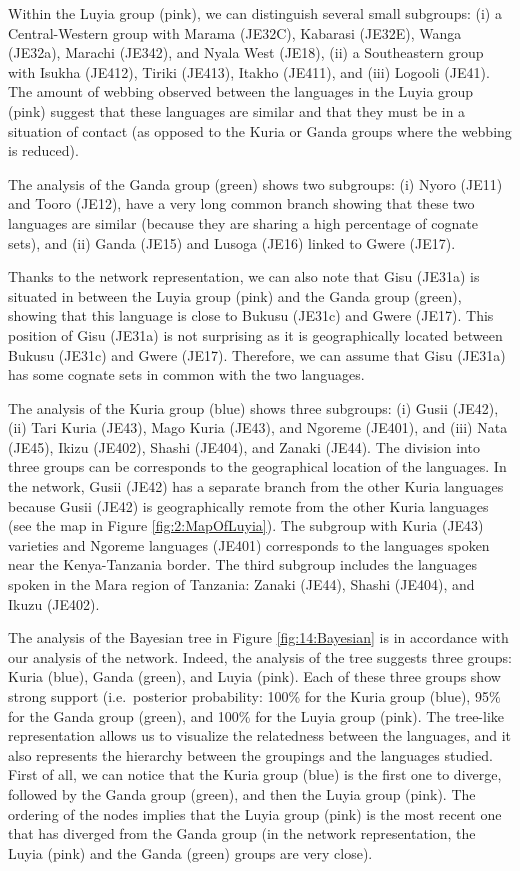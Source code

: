 \documentclass[output=paper]{langscibook}
\begin{document}
Within the Luyia group (pink), we can distinguish several small subgroups: (i) a Central-Western group with Marama (JE32C), Kabarasi (JE32E), Wanga (JE32a), Marachi (JE342), and Nyala West (JE18), (ii) a Southeastern group with Isukha (JE412), Tiriki (JE413), Itakho (JE411), and (iii) Logooli (JE41). The amount of webbing observed between the languages in the Luyia group (pink) suggest that these languages are similar and that they must be in a situation of contact (as opposed to the Kuria or Ganda groups where the webbing is reduced).

The analysis of the Ganda group (green) shows two subgroups: (i) Nyoro (JE11) and Tooro (JE12), have a very long common branch showing that these two languages are similar (because they are sharing a high percentage of cognate sets), and (ii) Ganda (JE15) and Lusoga (JE16) linked to Gwere (JE17).

Thanks to the network representation, we can also note that Gisu (JE31a) is situated in between the Luyia group (pink) and the Ganda group (green), showing that this language is close to Bukusu (JE31c) and Gwere (JE17). This position of Gisu (JE31a) is not surprising as it is geographically located between Bukusu (JE31c) and Gwere (JE17). Therefore, we can assume that Gisu (JE31a) has some cognate sets in common with the two languages. 

The analysis of the Kuria group (blue) shows three subgroups: (i) Gusii (JE42), (ii) Tari Kuria (JE43), Mago Kuria (JE43), and Ngoreme (JE401), and (iii) Nata (JE45), Ikizu (JE402), Shashi (JE404), and Zanaki (JE44). The division into three groups can be corresponds to the geographical location of the languages. In the network, Gusii (JE42) has a separate branch from the other Kuria languages because Gusii (JE42) is geographically remote from the other Kuria languages (see the map in Figure \ref{fig:2:MapOfLuyia}). The subgroup with Kuria (JE43) varieties and Ngoreme languages (JE401) corresponds to the languages spoken near the Kenya-Tanzania border. The third subgroup includes the languages spoken in the Mara region of Tanzania: Zanaki (JE44), Shashi (JE404), and Ikuzu (JE402).

The analysis of the Bayesian tree in Figure \ref{fig:14:Bayesian} is in accordance with our analysis of the network. Indeed, the analysis of the tree suggests three groups: Kuria (blue), Ganda (green), and Luyia (pink). Each of these three groups show strong support (i.e.\ posterior probability: 100\% for the Kuria group (blue), 95\% for the Ganda group (green), and 100\% for the Luyia group (pink). The tree-like representation allows us to visualize the relatedness between the languages, and it also represents the hierarchy between the groupings and the languages studied. First of all, we can notice that the Kuria group (blue) is the first one to diverge, followed by the Ganda group (green), and then the Luyia group (pink). The ordering of the nodes implies that the Luyia group (pink) is the most recent one that has diverged from the Ganda group (in the network representation, the Luyia (pink) and the Ganda (green) groups are very close). 
\end{document}
